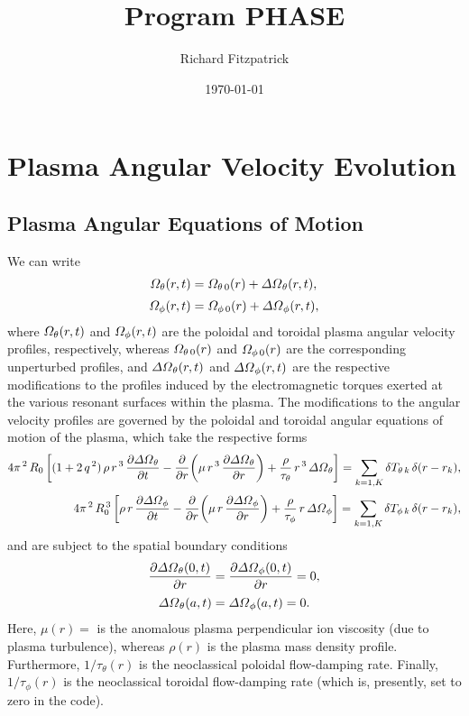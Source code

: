 \documentclass[12pt]{article}
\title{\bf Program PHASE}
\date{\today}
\author{Richard Fitzpatrick}
\begin{document}
\maketitle

\section{Plasma Angular Velocity Evolution}\label{appc}

\subsection{Plasma Angular Equations of Motion}
We can write
\begin{align}\label{e22x}
{\mit\Omega}_\theta(r,t) &={\mit\Omega}_{\theta\,0}(r) + {\mit\Delta\Omega}_\theta(r,t),\\[0.5ex]
{\mit\Omega}_\phi(r,t) &={\mit\Omega}_{\phi\,0}(r) + {\mit\Delta\Omega}_\phi(r,t),\label{e23x}
\end{align}
where  ${\mit\Omega}_{\theta}(r,t)$ and ${\mit\Omega}_{\phi}(r,t)$
  are the  poloidal and toroidal
plasma angular velocity profiles, respectively, whereas 
${\mit\Omega}_{\theta\,0}(r)$ and ${\mit\Omega}_{\phi\,0}(r)$ are
the corresponding unperturbed profiles, and 
 ${\mit\Delta\Omega}_{\theta}(r,t)$ and ${\mit\Delta\Omega}_{\phi}(r,t)$ 
are the respective modifications to the profiles induced by the  electromagnetic torques exerted at the various resonant surfaces
within the plasma. 
The modifications to the angular velocity profiles are governed by the poloidal and toroidal angular equations of
motion of the plasma, which take the respective
 forms
\begin{align}\label{eom1}
 4\pi^{\,2}\,R_0\left[(1+2\,q^{\,2})\,\rho\,r^{\,3}\,\frac{\partial{\mit\Delta\Omega}_\theta}{\partial t}-\frac{\partial}{\partial r}\!\left(
\mu\,r^{\,3}\,\frac{\partial{\mit\Delta\Omega}_\theta}{\partial r}\right) +\frac{\rho}{\tau_\theta}\,r^{\,3}\,{\mit\Delta\Omega}_\theta\right]
=\sum_{k=1,K} \delta T_{\theta\,k}\,\delta (r-r_k),\\[0.5ex]
 4\pi^{\,2}\,R_0^{\,3}\left[\rho\,r\,\frac{\partial{\mit\Delta\Omega}_\phi}{\partial t}-\frac{\partial}{\partial r}\!\left(
\mu\,r\,\frac{\partial{\mit\Delta\Omega}_\phi}{\partial r}\right) +\frac{\rho}{\tau_\phi}\,r\,{\mit\Delta\Omega}_\phi\right]
=\sum_{k=1,K} \delta T_{\phi\,k}\,\delta(r-r_k),\label{eom2}
\end{align}
and are subject to the spatial boundary conditions
\begin{align}
\frac{\partial{\mit\Delta\Omega}_\theta(0,t)}{\partial r} &=
\frac{\partial{\mit\Delta\Omega}_\phi(0,t)}{\partial r} =0,\\[0.5ex]
{\mit\Delta\Omega}_\theta(a,t)&={\mit\Delta\Omega}_\phi(a,t)=0.
\end{align}
Here, $\mu(r) = $ is the anomalous plasma perpendicular ion viscosity (due to plasma turbulence),
whereas 
$\rho(r)$ 
 is the plasma mass density profile. 
Furthermore, $1/\tau_\theta(r)$
is  the neoclassical poloidal flow-damping rate.
Finally, $1/\tau_\phi(r)$ is  the neoclassical toroidal flow-damping rate (which is, presently, set to zero in the code). 
\end{document}

